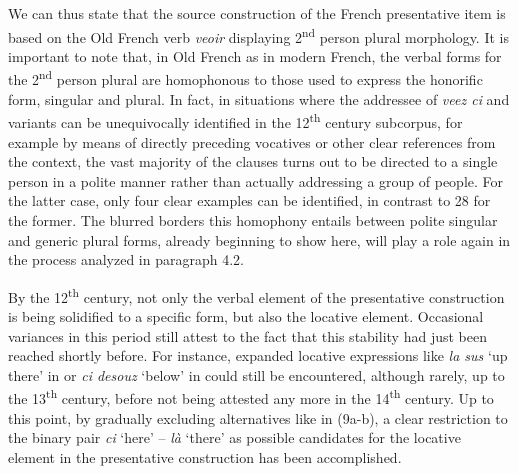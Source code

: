 \documentclass[output=paper]{langscibook}
\begin{document}
\begin{itemize}
\begin{itemize}
\begin{itemize}
\begin{itemize}
\begin{itemize}
\begin{itemize}
\begin{itemize}
We can thus state that the source construction of the French presentative item is based on the Old French verb \textit{veoir} displaying 2\textsuperscript{nd} person plural morphology. It is important to note that, in Old French as in modern French, the verbal forms for the 2\textsuperscript{nd} person plural are homophonous to those used to express the honorific form, singular and plural. In fact, in situations where the addressee of \textit{veez ci} and variants can be unequivocally identified in the 12\textsuperscript{th} century subcorpus, for example by means of directly preceding vocatives or other clear references from the context, the vast majority of the clauses turns out to be directed to a single person in a polite manner rather than actually addressing a group of people. For the latter case, only four clear examples can be identified, in contrast to 28 for the former. The blurred borders this homophony entails between polite singular and generic plural forms, already beginning to show here, will play a role again in the process analyzed in paragraph 4.2.

By the 12\textsuperscript{th} century, not only the verbal element of the presentative construction is being solidified to a specific form, but also the locative element. Occasional variances in this period still attest to the fact that this stability had just been reached shortly before. For instance, expanded locative expressions like \textit{la sus} ‘up there’ in  or \textit{ci desouz} ‘below’ in  could still be encountered, although rarely, up to the 13\textsuperscript{th} century, before not being attested any more in the 14\textsuperscript{th} century. Up to this point, by gradually excluding alternatives like in (9a-b), a clear restriction to the binary pair \textit{ci} ‘here’ – \textit{là} ‘there’ as possible candidates for the locative element in the presentative construction has been accomplished. 


\end{itemize}
\end{itemize}
\end{itemize}
\end{itemize}
\end{itemize}
\end{itemize}
\end{itemize}
\end{document}
